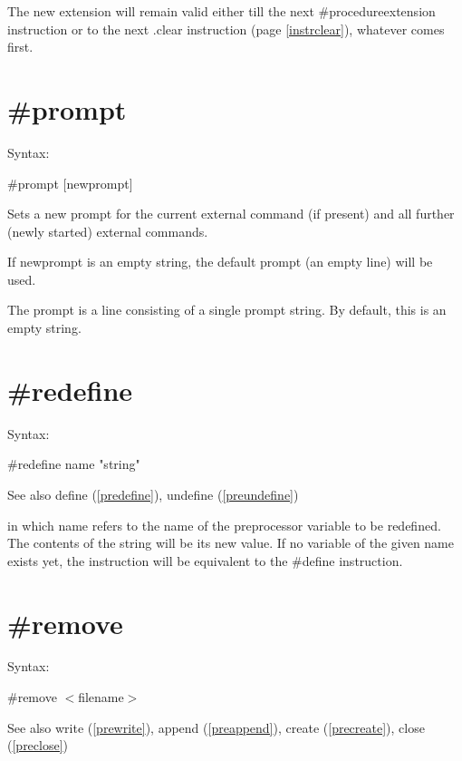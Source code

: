 \noindent The new extension will remain valid either till the next 
\#procedureextension instruction or to the next .clear 
instruction (page \ref{instrclear}), whatever comes first.


\section{\#prompt}
\label{preprompt}

\noindent Syntax:

\#prompt [newprompt]

\noindent Sets a new prompt for the current external 
command (if present) and all further (newly started) external commands.

If newprompt is an empty string, the default prompt (an empty line) will be 
used.

The prompt is a line consisting of a single prompt string. By 
default, this is an empty string.


\section{\#redefine}
\label{preredefine}

\noindent Syntax:

\#redefine name "string"
 
\noindent See also define (\ref{predefine}), undefine 
(\ref{preundefine})

\noindent in which name refers to the name of the 
preprocessor 
variable to be redefined. The contents of the 
string will be its new value. If no variable of the given name exists yet, 
the instruction will be equivalent to the \#define 
instruction.

 
\section{\#remove}
\label{preremove}

\noindent Syntax:

\#remove $<$filename$>$
 
\noindent See also write (\ref{prewrite}), append (\ref{preappend}),
            create (\ref{precreate}), close (\ref{preclose})

